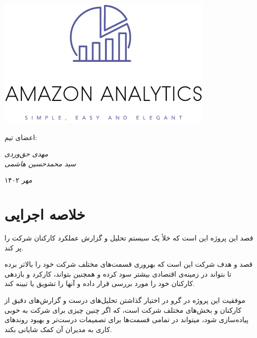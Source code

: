 \documentclass[12pt, dvipsnames, svgnames, x11names,]{article}
\begin{document}
    \begin{titlepage}
        \centering
        \vspace{1cm}
        {\Huge {}\par}
        \vspace{15mm}
         \includegraphics{../images/alogo} \par
        
        \vfill \par	\vfill
        
        {\small
        اعضای تیم: \par    
            \itshape                مهدی حق‌وردی\\
            سید محمدحسین هاشمی \par}
        \vspace{5cm}
        {\large مهر ۱۴۰۲\par}
    \end{titlepage}
\tableofcontents
\newpage

\section{خلاصه اجرایی}

قصد این پروژه این است که خلأ یک سیستم تحلیل و گزارش عملکرد کارکنان شرکت 
را پر کند. 

قصد و هدف شرکت 
این است که بهروری قسمت‌های مختلف شرکت‌ خود را بالاتر برده تا بتواند در زمینه‌ی اقتصادی بیشتر سود کرده و همچنین بتواند، کارکرد و بازدهی کارکنان خود را مورد بررسی قرار داده و آنها را تشویق یا تبینه کند.

موفقیت این پروژه در گرو در اختیار‌ گذاشتن تحلیل‌های درست و گزارش‌های دقیق از کارکنان و بخش‌های مختلف شرکت است، که اگر چنین چیزی برای شرکت 
به خوبی پیاده‌سازی شود، میتواند در تمامی قسمت‌ها برای تصمیمات درست‌تر و بهبود روند‌های کاری به مدیران آن کمک شایانی بکند.
\end{document}
